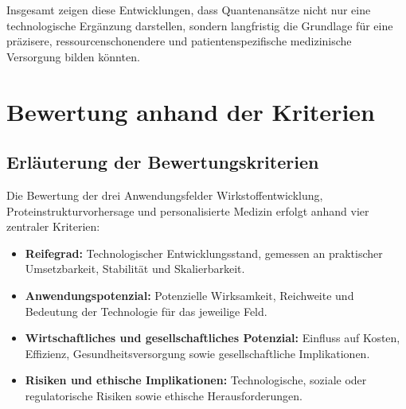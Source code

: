 Insgesamt zeigen diese Entwicklungen, dass Quantenansätze nicht nur eine technologische Ergänzung darstellen, sondern langfristig die Grundlage für eine präzisere, ressourcenschonendere und patientenspezifische medizinische Versorgung bilden könnten.



\section{Bewertung anhand der Kriterien}

\subsection*{Erläuterung der Bewertungskriterien}

Die Bewertung der drei Anwendungsfelder Wirkstoffentwicklung, Proteinstrukturvorhersage und personalisierte Medizin erfolgt anhand vier zentraler Kriterien:
\begin{itemize}
  \item \textbf{Reifegrad:} Technologischer Entwicklungsstand, gemessen an praktischer Umsetzbarkeit, Stabilität und Skalierbarkeit.\\
  \item \textbf{Anwendungspotenzial:} Potenzielle Wirksamkeit, Reichweite und Bedeutung der Technologie für das jeweilige Feld.\\
  \item \textbf{Wirtschaftliches und gesellschaftliches Potenzial:} Einfluss auf Kosten, Effizienz, Gesundheitsversorgung sowie gesellschaftliche Implikationen.\\
  \item \textbf{Risiken und ethische Implikationen:} Technologische, soziale oder regulatorische Risiken sowie ethische Herausforderungen.
\end{itemize}

